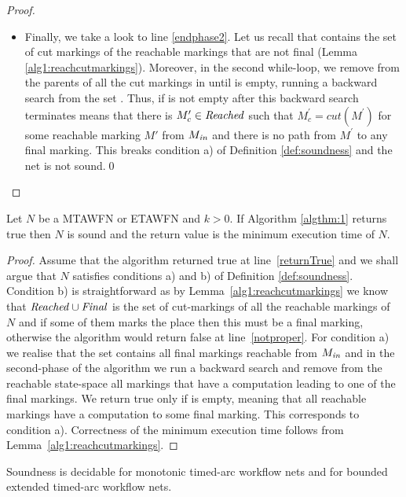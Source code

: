 \begin{proof}
\begin{itemize}
	\item Finally, we take a look to line \ref{endphase2}. Let us recall that  contains the set of cut markings of the reachable markings 
	that are not final (Lemma \ref{alg1:reachcutmarkings}). Moreover, in the second while-loop, we 
	remove from  the parents of all the cut markings in  until  is empty, running a backward search from the set
. Thus, if  is not empty after this backward search 
terminates means that there is $M^\prime_c \in {\mathit{Reached}}$ 
such that $M^\prime_c=cut(M^\prime)$ for some reachable marking
$M'$ from $M_{{\mathit{in}}}$ and there is no path from $M^\prime$ to any
final marking. This breaks condition a) of Definition \ref{def:soundness} and
the net is not sound.\qed
	\end{itemize}	
\end{proof}

\begin{lemma}\label{algthm:1:true}
	Let $N$ be a MTAWFN or ETAWFN and $k > 0$. If Algorithm \ref{algthm:1} returns true then $N$ is sound and the return value is the minimum execution
time of $N$.
\end{lemma}
\begin{proof}
Assume that the algorithm returned true at line~\ref{returnTrue} 
and we shall argue
that $N$ satisfies conditions a) and b) of Definition \ref{def:soundness}.
Condition b) is straightforward as by Lemma~\ref{alg1:reachcutmarkings}
we know that ${\mathit{Reached}} \cup {\mathit{Final}}$ is the set of cut-markings 
of all the reachable markings of $N$ and if some of them
marks the place  then this must be a final marking, otherwise
the algorithm would return false at line~\ref{notproper}.
For condition a) we realise that the set  contains
all final markings reachable from $M_{{\mathit{in}}}$ and 
in the second-phase of the algorithm we run a backward search
and remove from the reachable state-space all markings that have
a computation leading to one of the final markings. We
return true only if  is empty, meaning that all reachable markings
have a computation to some final marking. This corresponds to
condition a).
Correctness of the minimum execution time follows from Lemma~\ref{alg1:reachcutmarkings}.
\end{proof}


\begin{theorem}\label{thm:decid}
Soundness is decidable for monotonic timed-arc workflow nets and
for bounded extended timed-arc workflow nets.
\end{theorem}

